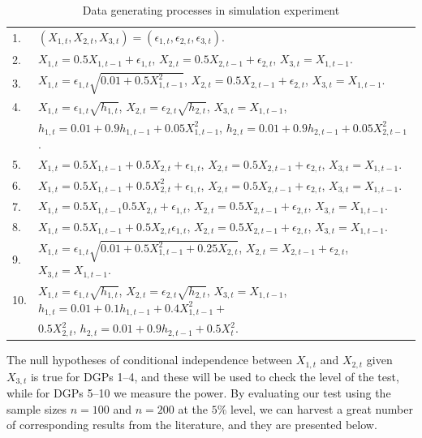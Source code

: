 \documentclass[
  12pt,
  letterpaper]{article}
\theoremstyle{definition}
\theoremstyle{definition}
\theoremstyle{definition}
\theoremstyle{remark}
\begin{document}
\begin{table}[t]
\begin{tabular}{ll}
\hline
1.& $(X_{1,t}, X_{2,t}, X_{3,t}) = (\epsilon_{1,t}, \epsilon_{2,t}, \epsilon_{3,t})$.\\
2.& $X_{1,t} = 0.5X_{1, t-1} + \epsilon_{1,t}$, $X_{2,t} = 0.5X_{2,t-1} + \epsilon_{2,t}$, $X_{3,t} = X_{1,t-1}$.\\
3.& $X_{1,t} = \epsilon_{1,t}\sqrt{0.01 + 0.5X_ {1,t-1}^2}$, $X_{2,t} = 0.5X_{2, t-1} + \epsilon_{2,t}$, $X_{3,t} = X_{1,t-1}$.\\
4.& $X_{1,t} = \epsilon_{1,t}\sqrt{h_{1,t}}$, $X_{2,t} = \epsilon_{2,t}\sqrt{h_{2,t}}$, $X_{3,t} = X_{1,t-1}$, \\ & $h_{1,t}  = 0.01 + 0.9h_{1,t-1} + 0.05X_{1,t-1}^2$, $h_{2,t} = 0.01 + 0.9h_{2,t-1} + 0.05X_{2,t-1}^2$. \\
5.& $X_{1,t} = 0.5X_{1,t-1} + 0.5X_{2,t} + \epsilon_{1,t}$, $X_{2,t} = 0.5X_{2,t-1} + \epsilon_{2,t}$, $X_{3,t} = X_{1,t-1}$.\\
6.& $X_{1,t} = 0.5X_{1,t-1} + 0.5X_{2,t}^2 + \epsilon_{1,t}$, $X_{2,t} = 0.5X_{2,t-1} + \epsilon_{2,t}$, $X_{3,t} = X_{1,t-1}$.\\
7.& $X_{1,t} = 0.5X_{1,t-1}0.5X_{2,t} + \epsilon_{1,t}$, $X_{2,t} = 0.5X_{2,t-1} + \epsilon_{2,t}$, $X_{3,t} = X_{1,t-1}$.\\
8.& $X_{1,t} = 0.5X_{1,t-1} + 0.5X_{2,t}\epsilon_{1,t}$, $X_{2,t} = 0.5X_{2,t-1} + \epsilon_{2,t}$, $X_{3,t} = X_{1,t-1}$.\\
9.& $X_{1,t} = \epsilon_{1,t}\sqrt{0.01 + 0.5X_{1,t-1}^2 + 0.25X_{2,t}}$, $X_{2,t} = X_{2,t-1} + \epsilon_{2,t}$, $X_{3,t} = X_{1,t-1}$.\\
10. & $X_{1,t} = \epsilon_{1,t}\sqrt{h_{1,t}}$, $X_{2,t} = \epsilon_{2,t}\sqrt{h_{2,t}}$, $X_{3,t} = X_{1,t-1}$, $h_{1,t} = 0.01 + 0.1h_{1, t-1} + 0.4X_{1,t-1}^2 +$ \\ & $0.5X_{2,t}^2$, $h_{2,t} = 0.01 + 0.9h_{2, t-1} + 0.5X_t^2$.\\
\hline
\end{tabular}
\caption{Data generating processes in simulation experiment}
\label{tab:dgps}
\end{table}

The null hypotheses of conditional independence between \(X_{1,t}\) and \(X_{2,t}\) given \(X_{3,t}\) is true for DGPs 1--4, and these will be used to check the level of the test, while for DGPs 5--10 we measure the power. By evaluating our test using the sample sizes \(n = 100\) and \(n = 200\) at the \(5\%\) level, we can harvest a great number of corresponding results from the literature, and they are presented below.
\end{document}
